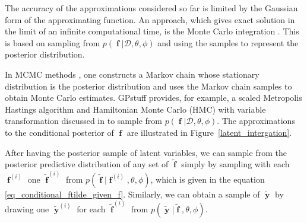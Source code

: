 \documentclass[twoside,11pt]{article}
\DeclareMathOperator{\f}{\mathbf{f}}
\DeclareMathOperator{\y}{\mathbf{y}}
\newcommand{\pkg}[1]{{\fontseries{b}\selectfont #1}}
\begin{document}
The accuracy of the approximations considered so far is limited by
the Gaussian form of the approximating function. An approach, which
gives exact solution in the limit of an infinite computational time,
is the Monte Carlo integration \citep{Robert+Casella:2004}. This is
based on sampling from $p(\f|\mathcal{D}, \theta, \phi)$ and using the
samples to represent the posterior distribution. 

In MCMC methods \citep{Gilks+Richardson+Spiegelhalter:1996}, one
constructs a Markov chain whose stationary distribution is the
posterior distribution and uses the Markov chain samples to obtain
Monte Carlo estimates. \pkg{GPstuff} provides, for example, a scaled
Metropolis Hastings algorithm \citep{Neal:1998} and Hamiltonian Monte
Carlo (HMC) \citep{Duane+Kennedy+Pendleton+Roweth:1987,Neal:1996a}
with variable transformation discussed in
\citep{Christensen+Roberts+Skold:2006,Vanhatalo+Vehtari:2007} to
sample from $p(\f|\mathcal{D}, \theta, \phi)$. The approximations to
the conditional posterior of $\f$ are illustrated in
Figure~\ref{latent_intergation}.

After having the posterior sample of latent variables, we can sample
from the posterior predictive distribution of any set of $\tilde{\f}$
simply by sampling with each $\f^{(i)}$ one $\tilde{\f}^{(i)}$ from
$p(\tilde{\f}|\f^{(i)},\theta,\phi)$, which is given in the equation
\eqref{eq_conditional_ftilde_given_f}. Similarly, we can obtain a
sample of $\tilde{\y}$ by drawing one $\tilde{\y}^{(i)}$ for each
$\tilde{\f}^{(i)}$ from $p(\tilde{\y}|\tilde{\f},\theta, \phi)$.
\end{document}
